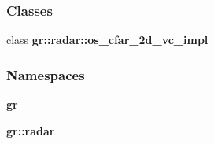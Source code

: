 \subsubsection*{Classes}
\begin{DoxyCompactItemize}
\item 
class {\bf gr\+::radar\+::os\+\_\+cfar\+\_\+2d\+\_\+vc\+\_\+impl}
\end{DoxyCompactItemize}
\subsubsection*{Namespaces}
\begin{DoxyCompactItemize}
\item 
 {\bf gr}
\item 
 {\bf gr\+::radar}
\end{DoxyCompactItemize}
